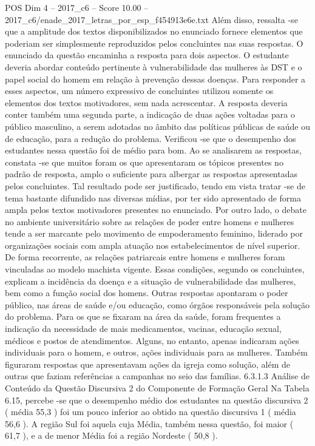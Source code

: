 \begin{textsample}{POS Dim 4 – 2017\_c6 – Score 10.00 – 2017\_c6/enade\_2017\_letras\_por\_esp\_f454913e6e.txt}
Além disso, ressalta -se que a amplitude dos textos disponibilizados no enunciado fornece elementos que poderiam ser simplesmente reproduzidos pelos concluintes nas suas respostas.
O enunciado da questão encaminha a resposta para dois aspectos.
O estudante deveria abordar conteúdo pertinente à vulnerabilidade das mulheres às DST e o papel social do homem em relação à prevenção dessas doenças.
Para responder a esses aspectos, um número expressivo de concluintes utilizou somente os elementos dos textos motivadores, sem nada acrescentar.
A resposta deveria conter também uma segunda parte, a indicação de duas ações voltadas para o público masculino, a serem adotadas no âmbito das políticas públicas de saúde ou de educação, para a redução do problema.
Verificou -se que o desempenho dos estudantes nessa questão foi de médio para bom.
Ao se analisarem as respostas, constata -se que muitos foram os que apresentaram os tópicos presentes no padrão de resposta, amplo o suficiente para albergar as respostas apresentadas pelos concluintes.
Tal resultado pode ser justificado, tendo em vista tratar -se de tema bastante difundido nas diversas mídias, por ter sido apresentado de forma ampla pelos textos motivadores presentes no enunciado.
Por outro lado, o debate no ambiente universitário sobre as relações de poder entre homens e mulheres tende a ser marcante pelo movimento de empoderamento feminino, liderado por organizações sociais com ampla atuação nos estabelecimentos de nível superior.
De forma recorrente, as relações patriarcais entre homens e mulheres foram vinculadas ao modelo machista vigente.
Essas condições, segundo os concluintes, explicam a incidência da doença e a situação de vulnerabilidade das mulheres, bem como a função social dos homens.
Outras respostas apontaram o poder público, nas áreas de saúde e/ou educação, como órgãos responsáveis pela solução do problema.
Para os que se fixaram na área da saúde, foram frequentes a indicação da necessidade de mais medicamentos, vacinas, educação sexual, médicos e postos de atendimentos.
Alguns, no entanto, apenas indicaram ações individuais para o homem, e outros, ações individuais para as mulheres.
Também figuraram respostas que apresentavam ações da igreja como solução, além de outras que faziam referências a campanhas no seio das famílias. 6.3.1.3 Análise de Conteúdo da Questão Discursiva 2 do Componente de Formação Geral Na Tabela 6.15, percebe -se que o desempenho médio dos estudantes na questão discursiva 2 ( média 55,3 ) foi um pouco inferior ao obtido na questão discursiva 1 ( média 56,6 ).
A região Sul foi aquela cuja Média, também nessa questão, foi maior ( 61,7 ), e a de menor Média foi a região Nordeste ( 50,8 ).

\end{textsample}
